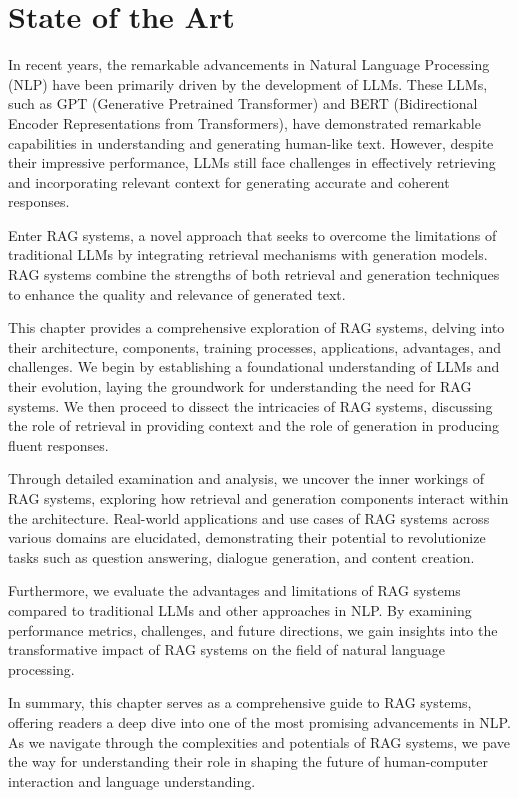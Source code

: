 \chapter{State of the Art}
\graphicspath{{state-of-the-art/figures/}}

In recent years, the remarkable advancements in Natural Language Processing (NLP) have been primarily driven by the development of LLMs. These LLMs, such as GPT (Generative Pretrained Transformer) and BERT (Bidirectional Encoder Representations from Transformers), have demonstrated remarkable capabilities in understanding and generating human-like text. However, despite their impressive performance, LLMs still face challenges in effectively retrieving and incorporating relevant context for generating accurate and coherent responses.

Enter RAG systems, a novel approach that seeks to overcome the limitations of traditional LLMs by integrating retrieval mechanisms with generation models. RAG systems combine the strengths of both retrieval and generation techniques to enhance the quality and relevance of generated text.

This chapter provides a comprehensive exploration of RAG systems, delving into their architecture, components, training processes, applications, advantages, and challenges. We begin by establishing a foundational understanding of LLMs and their evolution, laying the groundwork for understanding the need for RAG systems. We then proceed to dissect the intricacies of RAG systems, discussing the role of retrieval in providing context and the role of generation in producing fluent responses.

Through detailed examination and analysis, we uncover the inner workings of RAG systems, exploring how retrieval and generation components interact within the architecture. Real-world applications and use cases of RAG systems across various domains are elucidated, demonstrating their potential to revolutionize tasks such as question answering, dialogue generation, and content creation.

Furthermore, we evaluate the advantages and limitations of RAG systems compared to traditional LLMs and other approaches in NLP. By examining performance metrics, challenges, and future directions, we gain insights into the transformative impact of RAG systems on the field of natural language processing.

In summary, this chapter serves as a comprehensive guide to RAG systems, offering readers a deep dive into one of the most promising advancements in NLP. As we navigate through the complexities and potentials of RAG systems, we pave the way for understanding their role in shaping the future of human-computer interaction and language understanding.

